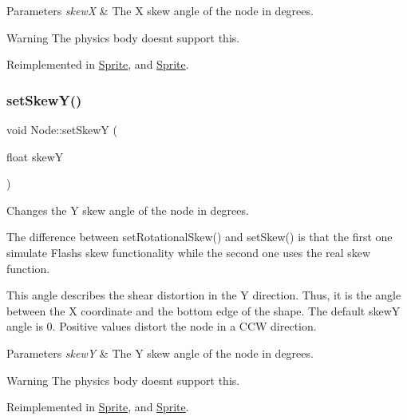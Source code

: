 \begin{DoxyParams}{Parameters}
{\em skewX} & The X skew angle of the node in degrees.\\
\hline
\end{DoxyParams}
\begin{DoxyWarning}{Warning}
The physics body doesn\textquotesingle{}t support this. 
\end{DoxyWarning}


Reimplemented in \hyperlink{classSprite_a975b779e48841943ebbe5147331fc8c2}{Sprite}, and \hyperlink{classSprite_ae6ad4d3c0f8be8d4ac45a0c1f8012896}{Sprite}.

\mbox{\label{classNode_ac1f4c4be8099a0d4bca1464c51f81f94}} 
\subsubsection{\texorpdfstring{set\+Skew\+Y()}{setSkewY()}\hspace{0.1cm}{\footnotesize\ttfamily [1/2]}}
{\footnotesize\ttfamily void Node\+::set\+SkewY (\begin{DoxyParamCaption}\item[{float}]{skewY }\end{DoxyParamCaption})\hspace{0.3cm}{\ttfamily [virtual]}}

Changes the Y skew angle of the node in degrees.

The difference between {\ttfamily set\+Rotational\+Skew()} and {\ttfamily set\+Skew()} is that the first one simulate Flash\textquotesingle{}s skew functionality while the second one uses the real skew function.

This angle describes the shear distortion in the Y direction. Thus, it is the angle between the X coordinate and the bottom edge of the shape. The default skewY angle is 0. Positive values distort the node in a C\+CW direction.


\begin{DoxyParams}{Parameters}
{\em skewY} & The Y skew angle of the node in degrees.\\
\hline
\end{DoxyParams}
\begin{DoxyWarning}{Warning}
The physics body doesn\textquotesingle{}t support this. 
\end{DoxyWarning}


Reimplemented in \hyperlink{classSprite_a5472345454102a7682c929b974573879}{Sprite}, and \hyperlink{classSprite_ab1d4bdeffe2b1fa8720481316123316a}{Sprite}.

